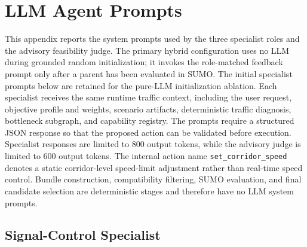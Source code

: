 
\appendix
\section{LLM Agent Prompts}
\label{app:agent-prompts}

This appendix reports the system prompts used by the three specialist roles
and the advisory feasibility judge.  The primary hybrid configuration uses no
LLM during grounded random initialization; it invokes the role-matched
feedback prompt only after a parent has been evaluated in SUMO.  The initial
specialist prompts below are retained for the pure-LLM initialization ablation.
Each specialist receives the same runtime
traffic context, including the user request, objective profile and weights,
scenario artifacts, deterministic traffic diagnosis, bottleneck subgraph, and
capability registry.  The prompts require a structured JSON response so that
the proposed action can be validated before execution.  Specialist responses
are limited to 800 output tokens, while the advisory judge is limited to 600
output tokens.  The internal action name \texttt{set\_corridor\_speed} denotes
a static corridor-level speed-limit adjustment rather than real-time speed
control.  Bundle construction, compatibility filtering, SUMO evaluation, and
final candidate selection are deterministic stages and therefore have no LLM
system prompts.


\subsection{Signal-Control Specialist}
\label{app:signal-prompt}

